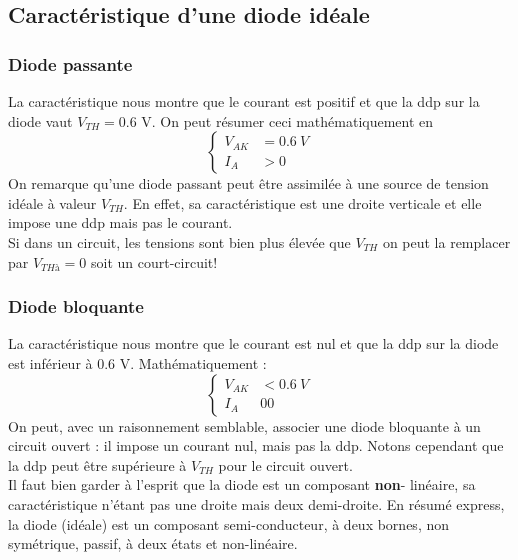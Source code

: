 		\subsection{Caractéristique d'une diode idéale}
			\subsubsection{Diode passante}
			La caractéristique nous montre que le courant est positif et que la 
			ddp sur la diode vaut $V_{TH} = 0.6$ V. On peut résumer ceci 
			mathématiquement en
			\begin{equation}
			\left\{\begin{array}{ll}
			V_{AK} &= 0.6\ V\\
			I_A &> 0
			\end{array}\right.
			\end{equation}
			On remarque qu'une diode passant peut être assimilée à une source de 
			tension idéale à valeur $V_{TH}$. En effet, sa caractéristique est une 
			droite verticale et elle impose une ddp mais pas le courant.\\
			Si dans un circuit, les tensions sont bien plus élevée que $V_{TH}$ on 
			peut la remplacer par $V_{THà}=0$ soit un court-circuit!
			
			\subsubsection{Diode bloquante}
			La caractéristique nous montre que le courant est nul et que la ddp sur 
			la diode est inférieur à 0.6 V. Mathématiquement :
			\begin{equation}
			\left\{\begin{array}{ll}
			V_{AK} &< 0.6\ V\\
			I_A &0 0
			\end{array}\right.
			\end{equation}	
			On peut, avec un raisonnement semblable, associer une diode bloquante à
			un circuit ouvert : il impose un courant nul, mais pas la ddp. Notons 
			cependant que la ddp peut être supérieure à $V_{TH}$ pour le circuit 
			ouvert.\\
			
		Il faut bien garder à l'esprit que la diode est un composant \textbf{non}-
		linéaire, sa caractéristique n'étant pas une droite mais deux demi-droite. 
		En résumé express, la diode (idéale) est un composant semi-conducteur, à deux
		bornes, non symétrique, passif, à deux états et non-linéaire.
		
